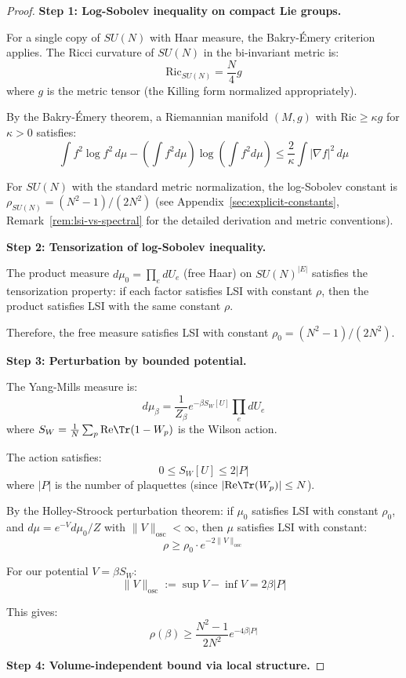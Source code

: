 \begin{proof}
\textbf{Step 1: Log-Sobolev inequality on compact Lie groups.}

For a single copy of $SU(N)$ with Haar measure, the Bakry-Émery criterion 
applies. The Ricci curvature of $SU(N)$ in the bi-invariant metric is:
\[
\mathrm{Ric}_{SU(N)} = \frac{N}{4} g
\]
where $g$ is the metric tensor (the Killing form normalized appropriately).

By the Bakry-Émery theorem, a Riemannian manifold $(M, g)$ with 
$\mathrm{Ric} \geq \kappa g$ for $\kappa > 0$ satisfies:
\[
\int f^2 \log f^2 \, d\mu - \left(\int f^2 d\mu\right)\log\left(\int f^2 d\mu\right) 
\leq \frac{2}{\kappa} \int |\nabla f|^2 \, d\mu
\]

For $SU(N)$ with the standard metric normalization, the log-Sobolev constant is 
$\rho_{SU(N)} = (N^2-1)/(2N^2)$ (see Appendix~\ref{sec:explicit-constants}, 
Remark~\ref{rem:lsi-vs-spectral} for the detailed derivation and metric conventions).

\textbf{Step 2: Tensorization of log-Sobolev inequality.}

The product measure $d\mu_0 = \prod_e dU_e$ (free Haar) on $SU(N)^{|E|}$ 
satisfies the tensorization property: if each factor satisfies LSI with 
constant $\rho$, then the product satisfies LSI with the same constant $\rho$.

Therefore, the free measure satisfies LSI with constant $\rho_0 = (N^2-1)/(2N^2)$.

\textbf{Step 3: Perturbation by bounded potential.}

The Yang-Mills measure is:
\[
d\mu_\beta = \frac{1}{Z_\beta} e^{-\beta S_W[U]} \prod_e dU_e
\]
where $S_W = \frac{1}{N}\sum_p \mathrm{Re}\Tr(1 - W_p)$ is the Wilson action.

The action satisfies:
\[
0 \leq S_W[U] \leq 2|P|
\]
where $|P|$ is the number of plaquettes (since $|\mathrm{Re}\Tr(W_p)| \leq N$).

By the Holley-Stroock perturbation theorem: if $\mu_0$ satisfies LSI with 
constant $\rho_0$, and $d\mu = e^{-V} d\mu_0 / Z$ with $\|V\|_{\mathrm{osc}} < \infty$, 
then $\mu$ satisfies LSI with constant:
\[
\rho \geq \rho_0 \cdot e^{-2\|V\|_{\mathrm{osc}}}
\]

For our potential $V = \beta S_W$:
\[
\|V\|_{\mathrm{osc}} := \sup V - \inf V = 2\beta |P|
\]

This gives:
\[
\rho(\beta) \geq \frac{N^2-1}{2N^2} e^{-4\beta |P|}
\]

\textbf{Step 4: Volume-independent bound via local structure.}


\end{proof}
